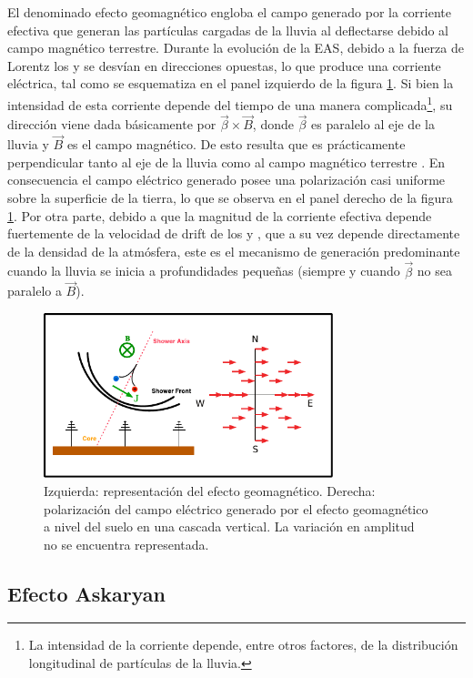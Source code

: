 	El denominado efecto geomagn\'etico engloba el campo generado por la corriente efectiva que generan las part\'iculas cargadas de la lluvia al deflectarse debido al campo magn\'etico terrestre.
	Durante la evoluci\'on de la EAS, debido a la fuerza de Lorentz los \el{+} y \el{-} se desv\'ian en direcciones opuestas, lo que produce una corriente el\'ectrica, tal como se esquematiza en el panel izquierdo de la figura \ref{fig:geom_sketch}.
	Si bien la intensidad de esta corriente depende del tiempo de una manera complicada\footnote{La intensidad de la corriente depende, entre otros factores, de la distribuci\'on longitudinal de part\'iculas de la lluvia.}, su direcci\'on viene dada b\'asicamente por $\vec\beta\times \vec B$, donde $\vec \beta$ es paralelo al eje de la lluvia y $\vec B$ es el campo magn\'etico. 
	De esto resulta que es pr\'acticamente perpendicular tanto al eje de la lluvia como al campo magn\'etico terrestre \cite{kahn:1966}.
	En consecuencia el campo el\'ectrico generado posee una polarizaci\'on casi uniforme sobre la superficie de la tierra, lo que se observa en el panel derecho de la figura \ref{fig:geom_sketch}.
	Por otra parte, debido a que la magnitud de la corriente efectiva depende fuertemente de la velocidad de drift de los \el{+} y \el{-}, que a su vez depende directamente de la densidad de la atm\'osfera, este es el mecanismo de generaci\'on predominante cuando la lluvia se inicia a profundidades peque\~nas (siempre y cuando $\vec\beta$ no sea paralelo a $\vec B$).
	\begin{figure}[ht!]
		\centering
		\includegraphics[width=0.75\textwidth]{fig/EASRadio/geom_sketch}
		\caption{\label{fig:geom_sketch} Izquierda: representaci\'on del efecto geomagn\'etico. Derecha: polarizaci\'on del campo el\'ectrico generado por el efecto geomagn\'etico a nivel del suelo en una cascada vertical. La variaci\'on en amplitud no se encuentra representada.}
	\end{figure}
	
\subsection{Efecto Askaryan}
\label{sbsc:ask_emision}
	
